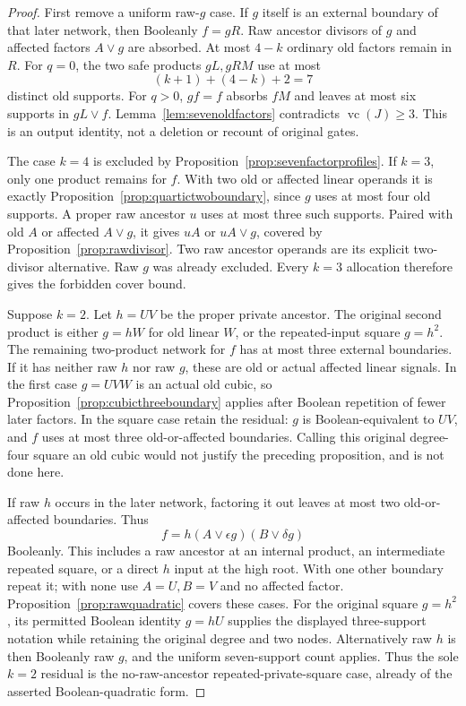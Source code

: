 \documentclass[11pt]{article}
\newcommand{\vc}{\operatorname{vc}}
\theoremstyle{definition}
\theoremstyle{remark}
\begin{document}
\begin{proof}
First remove a uniform raw-$g$ case. If $g$ itself is an external boundary of that later network, then Booleanly $f=gR$. Raw ancestor divisors of $g$ and affected factors $A\vee g$ are absorbed. At most $4-k$ ordinary old factors remain in $R$. For $q=0$, the two safe products $gL,gRM$ use at most
\[
 (k+1)+(4-k)+2=7
\]
distinct old supports. For $q>0$, $gf=f$ absorbs $fM$ and leaves at most six supports in $gL\vee f$. Lemma~\ref{lem:sevenoldfactors} contradicts $\vc(J)\ge3$. This is an output identity, not a deletion or recount of original gates.

The case $k=4$ is excluded by Proposition~\ref{prop:sevenfactorprofiles}. If $k=3$, only one product remains for $f$. With two old or affected linear operands it is exactly Proposition~\ref{prop:quartictwoboundary}, since $g$ uses at most four old supports. A proper raw ancestor $u$ uses at most three such supports. Paired with old $A$ or affected $A\vee g$, it gives $uA$ or $uA\vee g$, covered by Proposition~\ref{prop:rawdivisor}. Two raw ancestor operands are its explicit two-divisor alternative. Raw $g$ was already excluded. Every $k=3$ allocation therefore gives the forbidden cover bound.

Suppose $k=2$. Let $h=UV$ be the proper private ancestor. The original second product is either $g=hW$ for old linear $W$, or the repeated-input square $g=h^2$. The remaining two-product network for $f$ has at most three external boundaries. If it has neither raw $h$ nor raw $g$, these are old or actual affected linear signals. In the first case $g=UVW$ is an actual old cubic, so Proposition~\ref{prop:cubicthreeboundary} applies after Boolean repetition of fewer later factors. In the square case retain the residual: $g$ is Boolean-equivalent to $UV$, and $f$ uses at most three old-or-affected boundaries. Calling this original degree-four square an old cubic would not justify the preceding proposition, and is not done here.

If raw $h$ occurs in the later network, factoring it out leaves at most two old-or-affected boundaries. Thus
\[
 f=h(A\vee\epsilon g)(B\vee\delta g)
\]
Booleanly. This includes a raw ancestor at an internal product, an intermediate repeated square, or a direct $h$ input at the high root. With one other boundary repeat it; with none use $A=U,B=V$ and no affected factor. Proposition~\ref{prop:rawquadratic} covers these cases. For the original square $g=h^2$, its permitted Boolean identity $g=hU$ supplies the displayed three-support notation while retaining the original degree and two nodes. Alternatively raw $h$ is then Booleanly raw $g$, and the uniform seven-support count applies. Thus the sole $k=2$ residual is the no-raw-ancestor repeated-private-square case, already of the asserted Boolean-quadratic form.


\end{proof}
\end{document}
